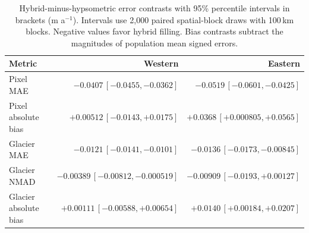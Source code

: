 \begin{table}[!htbp]
\centering\small
\setlength{\tabcolsep}{5pt}
\caption{Hybrid-minus-hypsometric error contrasts with 95\% percentile intervals in brackets (m a$^{-1}$). Intervals use 2,000 paired spatial-block draws with 100\,km blocks. Negative values favor hybrid filling. Bias contrasts subtract the magnitudes of population mean signed errors.}
\label{tab:paired}
\begin{tabular}{lrr}
\toprule
Metric & Western & Eastern \\
\midrule
Pixel MAE & $-0.0407\,[-0.0455, -0.0362]$ & $-0.0519\,[-0.0601, -0.0425]$ \\
Pixel absolute bias & $+0.00512\,[-0.0143, +0.0175]$ & $+0.0368\,[+0.000805, +0.0565]$ \\
Glacier MAE & $-0.0121\,[-0.0141, -0.0101]$ & $-0.0136\,[-0.0173, -0.00845]$ \\
Glacier NMAD & $-0.00389\,[-0.00812, -0.000519]$ & $-0.00909\,[-0.0193, +0.00127]$ \\
Glacier absolute bias & $+0.00111\,[-0.00588, +0.00654]$ & $+0.0140\,[+0.00184, +0.0207]$ \\
\bottomrule
\end{tabular}
\end{table}
